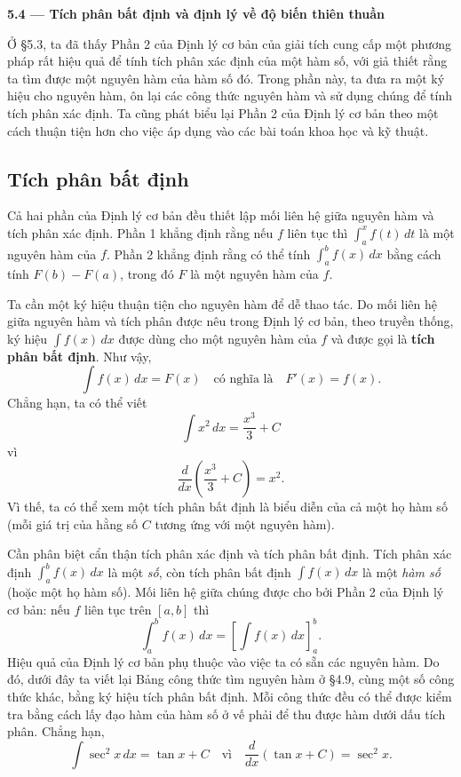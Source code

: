 \documentclass[12pt,a4paper]{article}
\begin{document}
\begin{center}
{\LARGE\bfseries 5.4 — Tích phân bất định và định lý về độ biến thiên thuần}\par
\end{center}

Ở §5.3, ta đã thấy Phần 2 của Định lý cơ bản của giải tích cung cấp một phương pháp rất hiệu quả để tính tích phân xác định của một hàm số, với giả thiết rằng ta tìm được một nguyên hàm của hàm số đó. Trong phần này, ta đưa ra một ký hiệu cho nguyên hàm, ôn lại các công thức nguyên hàm và sử dụng chúng để tính tích phân xác định. Ta cũng phát biểu lại Phần 2 của Định lý cơ bản theo một cách thuận tiện hơn cho việc áp dụng vào các bài toán khoa học và kỹ thuật.

\subsection*{Tích phân bất định}
Cả hai phần của Định lý cơ bản đều thiết lập mối liên hệ giữa nguyên hàm và tích phân xác định. Phần 1 khẳng định rằng nếu $f$ liên tục thì $\int_a^x f(t)\,dt$ là một nguyên hàm của $f$. Phần 2 khẳng định rằng có thể tính $\int_a^b f(x)\,dx$ bằng cách tính $F(b)-F(a)$, trong đó $F$ là một nguyên hàm của $f$.

Ta cần một ký hiệu thuận tiện cho nguyên hàm để dễ thao tác. Do mối liên hệ giữa nguyên hàm và tích phân được nêu trong Định lý cơ bản, theo truyền thống, ký hiệu $\int f(x)\,dx$ được dùng cho một nguyên hàm của $f$ và được gọi là \textbf{tích phân bất định}. Như vậy,
\[
\int f(x)\,dx=F(x)\quad\text{có nghĩa là}\quad F'(x)=f(x).
\]
Chẳng hạn, ta có thể viết
\[
\int x^2\,dx=\frac{x^3}{3}+C
\]
vì
\[
\frac{d}{dx}\left(\frac{x^3}{3}+C\right)=x^2.
\]
Vì thế, ta có thể xem một tích phân bất định là biểu diễn của cả một họ hàm số (mỗi giá trị của hằng số $C$ tương ứng với một nguyên hàm).

Cần phân biệt cẩn thận tích phân xác định và tích phân bất định. Tích phân xác định $\int_a^b f(x)\,dx$ là một \textit{số}, còn tích phân bất định $\int f(x)\,dx$ là một \textit{hàm số} (hoặc một họ hàm số). Mối liên hệ giữa chúng được cho bởi Phần 2 của Định lý cơ bản: nếu $f$ liên tục trên $[a,b]$ thì
\[
\int_a^b f(x)\,dx=\left[\int f(x)\,dx\right]_a^b.
\]
Hiệu quả của Định lý cơ bản phụ thuộc vào việc ta có sẵn các nguyên hàm. Do đó, dưới đây ta viết lại Bảng công thức tìm nguyên hàm ở §4.9, cùng một số công thức khác, bằng ký hiệu tích phân bất định. Mỗi công thức đều có thể được kiểm tra bằng cách lấy đạo hàm của hàm số ở vế phải để thu được hàm dưới dấu tích phân. Chẳng hạn,
\[
\int\sec^2x\,dx=\tan x+C
\quad\text{vì}\quad \frac{d}{dx}(\tan x+C)=\sec^2x.
\]
\end{document}
